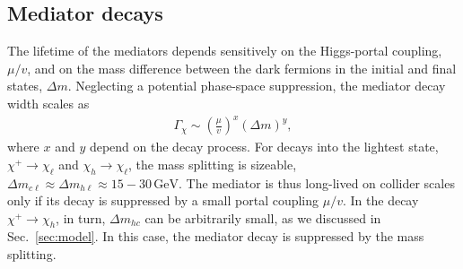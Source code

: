 \documentclass[nofootinbib,prd,aps,superscriptaddress,preprintnumbers]{revtex4}
\begin{document}
\subsection{Mediator decays}
%
\noindent
The lifetime of the mediators depends sensitively on the Higgs-portal coupling, $\mu/v$, and on the mass difference between the dark fermions in the initial and final states, $\Delta m$. Neglecting a potential phase-space suppression, the mediator decay width scales as
\begin{align}
\Gamma_{\chi} \sim \left(\frac{\mu}{v}\right)^x(\Delta m)^y,
\end{align}
where $x$ and $y$ depend on the decay process. For decays into the lightest state, $\chi^+ \to \chi_\ell$ and $\chi_h \to \chi_\ell$, the mass splitting is sizeable, $\Delta m_{c\ell} \approx \Delta m_{h\ell} \approx 15-30\,\text{GeV}$. The mediator is thus long-lived on collider scales only if its decay is suppressed by a small portal coupling $\mu/v$. In the decay $\chi^+ \to \chi_h$, in turn, $\Delta m_{hc}$ can be arbitrarily small, as we discussed in Sec.~\ref{sec:model}. In this case, the mediator decay is suppressed by the mass splitting.
\end{document}
